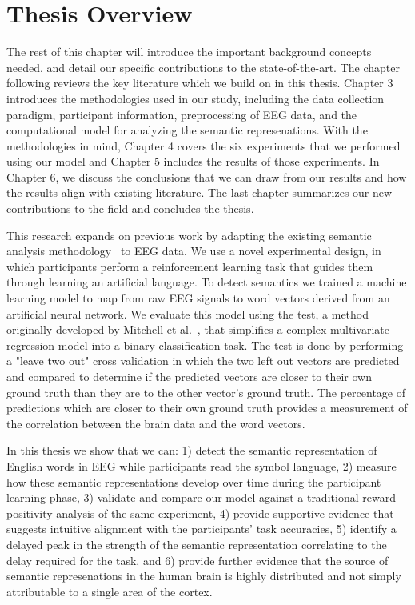 \section{Thesis Overview}

The rest of this chapter will introduce the important background concepts 
needed, and detail our specific contributions to the state-of-the-art. The 
chapter following reviews the key literature which we build on in this thesis.  
Chapter 3 introduces the methodologies used in our study, including the data 
collection paradigm, participant information, preprocessing of EEG data, and 
the computational model for analyzing the semantic represenations. With the 
methodologies in mind, Chapter 4 covers the six experiments that we performed 
using our model and Chapter 5 includes the results of those experiments. In 
Chapter 6, we discuss the conclusions that we can draw from our results and how 
the results align with existing literature. The last chapter summarizes our new 
contributions to the field and concludes the thesis.

This research expands on previous work by adapting the existing semantic 
analysis methodology~\cite{Mitchell2008,Sudre2012} to EEG data.  We use a novel 
experimental design, in which participants perform a reinforcement learning 
task that guides them through learning an artificial language. To detect 
semantics we trained a machine learning model to map from raw EEG signals to 
word vectors derived from an artificial neural network. We evaluate this model 
using the \tvt test, a method originally developed by Mitchell et 
al.~\cite{Mitchell2008}, that simplifies a complex multivariate regression 
model into a binary classification task. The \tvt test is done by performing a 
"leave two out" cross validation in which the two left out vectors are 
predicted and compared to determine if the predicted vectors are closer to 
their own ground truth than they are to the other vector's ground truth. The 
percentage of predictions which are closer to their own ground truth provides a 
measurement of the correlation between the brain data and the word vectors.

In this thesis we show that we can: 1) detect the semantic representation of 
English words in EEG while participants read the symbol language, 2) measure 
how these semantic representations develop over time during the participant 
learning phase, 3) validate and compare our model against a traditional reward 
positivity analysis of the same experiment, 4) provide supportive evidence that 
suggests intuitive alignment with the participants' task accuracies, 5) 
identify a delayed peak in the strength of the semantic representation 
correlating to the delay required for the task, and 6) provide further evidence 
that the source of semantic represenations in the human brain is highly 
distributed and not simply attributable to a single area of the cortex.
